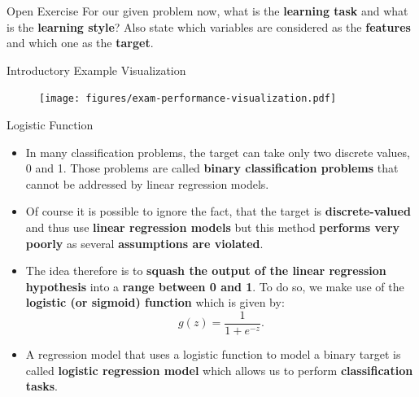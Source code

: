 \documentclass[document.tex]{subfiles}
\begin{document}
    \begin{frame}{Open Exercise }
        For our given problem now, what is the \textbf{learning task} and what is the \textbf{learning style}? Also state which variables are considered as the \textbf{features} and which one as the \textbf{target}.
        
    \end{frame}

    \begin{frame}{Introductory Example Visualization}
        \begin{figure}
            \label{fig:exam-performance-visualization}
            \texttt{[image: figures/exam-performance-visualization.pdf]}
        \end{figure}
    \end{frame}

	\begin{frame}{Logistic Function}
        \begin{itemize}
            \item In many classification problems, the target can take only two discrete values, 0 and 1. Those problems are called \textbf{binary classification problems} that cannot be addressed by linear regression models.
            \item Of course it is possible to ignore the fact, that the target is \textbf{discrete-valued} and thus use \textbf{linear regression models} but this method \textbf{performs very poorly} as several \textbf{assumptions are violated}.
            \item The idea therefore is to \textbf{squash the output of the linear regression hypothesis} into a \textbf{range between 0 and 1}. To do so, we make use of the \textbf{logistic (or sigmoid) function} which is given by:
            $$g(z) = \frac{1}{1 + e^{-z}}.$$
            \item A regression model that uses a logistic function to model a binary target is called \textbf{logistic regression model} which allows us to perform \textbf{classification tasks}.
        \end{itemize}
    \end{frame}
\end{document}
